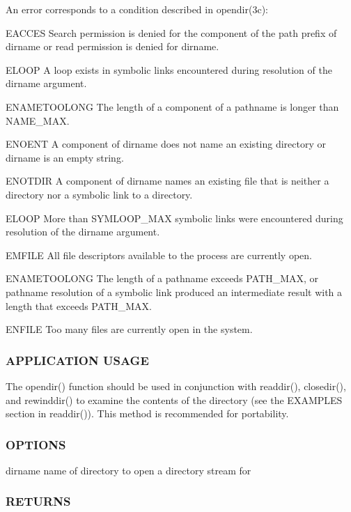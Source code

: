 \begin{DoxyVerb}    An error corresponds to a condition described in opendir(3c):

    EACCES    Search permission is denied for the component of the
              path prefix of dirname or read permission is denied
              for dirname.

    ELOOP     A loop exists in symbolic links encountered during
              resolution of the dirname argument.

    ENAMETOOLONG  The length of a component of a pathname is longer than {NAME_MAX}.

    ENOENT        A component of dirname does not name an existing directory or dirname is an empty string.

    ENOTDIR       A component of dirname names an existing file that is neither a directory nor a symbolic link to a directory.

    ELOOP         More than {SYMLOOP_MAX} symbolic links were encountered during resolution of the dirname argument.

    EMFILE        All file descriptors available to the process are currently open.

    ENAMETOOLONG  The length of a pathname exceeds {PATH_MAX},
                  or pathname resolution of a symbolic link produced an intermediate
                  result with a length that exceeds {PATH_MAX}.

    ENFILE        Too many files are currently open in the system.
\end{DoxyVerb}


\subsubsection*{A\+P\+P\+L\+I\+C\+A\+T\+I\+ON U\+S\+A\+GE}

The opendir() function should be used in conjunction with readdir(), closedir(), and rewinddir() to examine the contents of the directory (see the E\+X\+A\+M\+P\+L\+ES section in readdir()). This method is recommended for portability. \subsubsection*{O\+P\+T\+I\+O\+NS}

dirname name of directory to open a directory stream for \subsubsection*{R\+E\+T\+U\+R\+NS}

